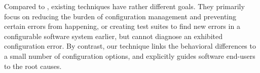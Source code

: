 Compared to \ourtool, existing techniques have rather different
goals. They primarily focus on reducing the burden of
configuration management and preventing certain errors from
happening, or creating test suites to find new errors in
a configurable software system earlier, but cannot
diagnose an exhibited configuration error. By contrast, our \ourtool technique
links the behavioral differences to a small number
of configuration options, and explicitly guides software end-users
to the root causes.






